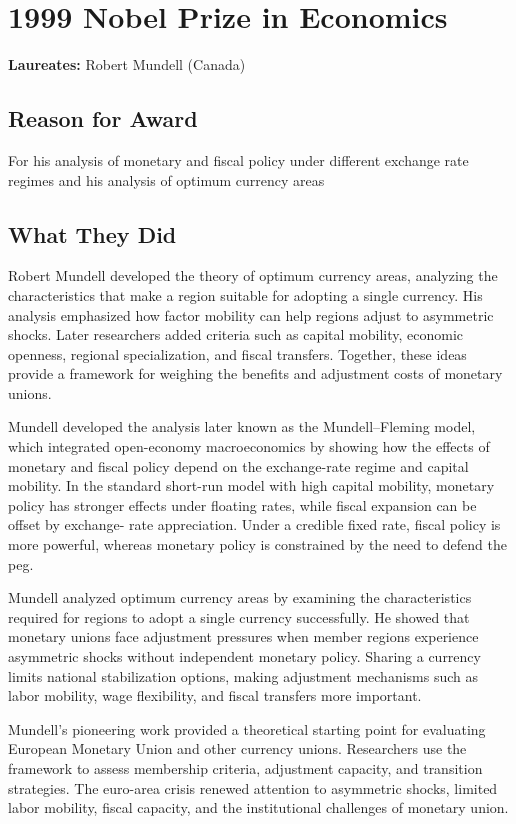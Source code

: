 \chapter{1999 Nobel Prize in Economics}
\textbf{Laureates: }Robert Mundell (Canada)

\section*{Reason for Award}
For his analysis of monetary and fiscal policy under different exchange rate
regimes and his analysis of optimum currency areas

\section{What They Did}
Robert Mundell developed the theory of optimum currency areas, analyzing the
characteristics that make a region suitable for adopting a single currency. His
analysis emphasized how factor mobility can help regions adjust to asymmetric
shocks. Later researchers added criteria such as capital mobility, economic
openness, regional specialization, and fiscal transfers. Together, these ideas
provide a framework for weighing the benefits and adjustment costs of monetary
unions.

Mundell developed the analysis later known as the Mundell--Fleming model, which
integrated open-economy macroeconomics by showing how the effects of monetary and
fiscal policy depend on the exchange-rate regime and capital mobility. In the
standard short-run model with high capital mobility, monetary policy has stronger
effects under floating rates, while fiscal expansion can be offset by exchange-
rate appreciation. Under a credible fixed rate, fiscal policy is more powerful,
whereas monetary policy is constrained by the need to defend the peg.

Mundell analyzed optimum currency areas by examining the characteristics
required for regions to adopt a single currency successfully. He showed that
monetary unions face adjustment pressures when member regions experience
asymmetric shocks without independent monetary policy. Sharing a currency limits
national stabilization options, making adjustment mechanisms such as labor
mobility, wage flexibility, and fiscal transfers more important.

Mundell's pioneering work provided a theoretical starting point for evaluating
European Monetary Union and other currency unions. Researchers use the framework
to assess membership criteria, adjustment capacity, and transition strategies.
The euro-area crisis renewed attention to asymmetric shocks, limited labor
mobility, fiscal capacity, and the institutional challenges of monetary union.

